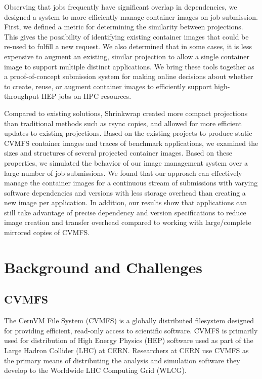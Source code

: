 \documentclass[conference]{IEEEtran}
\begin{document}
Observing that jobs frequently have significant overlap in dependencies,
we designed a system to more efficiently manage container images on job submission.
First, we defined a metric for determining the similarity between projections.
This gives the possibility of identifying existing container images that could be re-used to fulfill a new request.
We also determined that in some cases,
it is less expensive to augment an existing, similar projection to allow a single container image to support multiple distinct applications.
We bring these tools together as a proof-of-concept submission system for making online decisions about whether to create, reuse, or augment container images to efficiently support high-throughput HEP jobs on HPC resources. 

Compared to existing solutions,
Shrinkwrap created more compact projections than traditional methods such as rsync copies,
and allowed for more efficient updates to existing projections.
Based on the existing projects to produce static CVMFS container images and traces of benchmark applications,
we examined the sizes and structures of several projected container images.
Based on these properties,
we simulated the behavior of our image management system over a large number of job submissions.
We found that our approach can effectively manage the container images for a continuous stream of submissions with varying software dependencies and versions with less storage overhead than creating a new image per application.
In addition, our results show that applications can still take advantage of precise dependency and version specifications to reduce image creation and transfer overhead compared to working with large/complete mirrored copies of CVMFS.

\section{Background and Challenges}

\subsection{CVMFS}
The CernVM File System (CVMFS) is a globally distributed filesystem designed for providing efficient,
read-only access to scientific software.
CVMFS is primarily used for distribution of High Energy Physics (HEP) software used as part of the Large Hadron Collider (LHC) at CERN.
Researchers at CERN use CVMFS as the primary means of distributing the analysis and simulation software they develop to the Worldwide LHC Computing Grid (WLCG).
\end{document}

